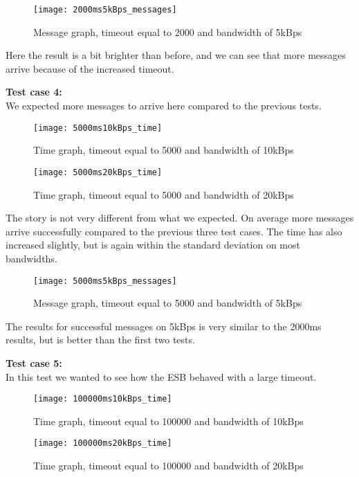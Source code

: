 	\begin{figure}[H]
		\centering
		\texttt{[image: 2000ms5kBps\_messages]}
		\caption{Message graph, timeout equal to 2000 and bandwidth of 5kBps} 
		\label{figure:results:2000ms5kBps_messages}
	\end{figure}
    Here the result is a bit brighter than before, and we can see that more messages arrive because of the increased timeout.
    
    \textbf{Test case 4:}\\
    We expected more messages to arrive here compared to the previous tests.
    \begin{figure}[H]
		\centering
		\texttt{[image: 5000ms10kBps\_time]}
		\caption{Time graph, timeout equal to 5000 and bandwidth of 10kBps} 
		\label{figure:results:5000ms10kBps_time}
	\end{figure}
	
	\begin{figure}[H]
		\centering
		\texttt{[image: 5000ms20kBps\_time]}
		\caption{Time graph, timeout equal to 5000 and bandwidth of 20kBps} 
		\label{figure:results:5000ms20kBps_time}
	\end{figure}
	
	The story is not very different from what we expected. On average more messages arrive successfully compared to the previous three test cases. The time has also increased slightly, but is again within the standard deviation on most bandwidths.
	
	\begin{figure}[H]
		\centering
		\texttt{[image: 5000ms5kBps\_messages]}
		\caption{Message graph, timeout equal to 5000 and bandwidth of 5kBps} 
		\label{figure:results:5000ms5kBps_messages}
	\end{figure}
	The results for successful messages on 5kBps is very similar to the 2000ms results, but is better than the first two tests.
    
    \textbf{Test case 5:}\\
    In this test we wanted to see how the ESB behaved with a large timeout.
    \begin{figure}[H]
		\centering
		\texttt{[image: 100000ms10kBps\_time]}
		\caption{Time graph, timeout equal to 100000 and bandwidth of 10kBps} 
		\label{figure:results:100000ms10kBps_time}
	\end{figure}
	
	\begin{figure}[H]
		\centering
		\texttt{[image: 100000ms20kBps\_time]}
		\caption{Time graph, timeout equal to 100000 and bandwidth of 20kBps} 
		\label{figure:results:100000ms20kBps_time}
	\end{figure}
	
